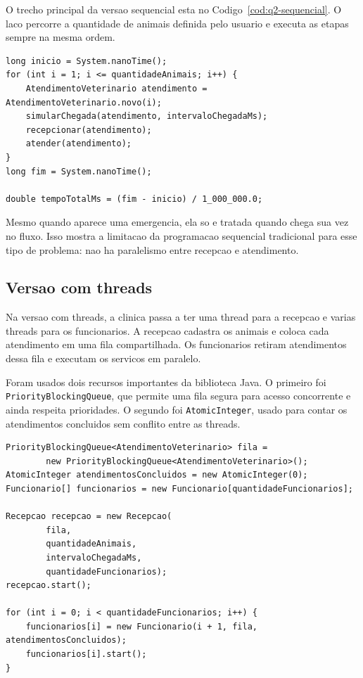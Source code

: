 O trecho principal da versao sequencial esta no Codigo~\ref{cod:q2-sequencial}. O laco percorre a quantidade de animais definida pelo usuario e executa as etapas sempre na mesma ordem.

\begin{lstlisting}[caption={Fluxo principal da versao sequencial.}, label={cod:q2-sequencial}]
long inicio = System.nanoTime();
for (int i = 1; i <= quantidadeAnimais; i++) {
    AtendimentoVeterinario atendimento = AtendimentoVeterinario.novo(i);
    simularChegada(atendimento, intervaloChegadaMs);
    recepcionar(atendimento);
    atender(atendimento);
}
long fim = System.nanoTime();

double tempoTotalMs = (fim - inicio) / 1_000_000.0;
\end{lstlisting}

Mesmo quando aparece uma emergencia, ela so e tratada quando chega sua vez no fluxo. Isso mostra a limitacao da programacao sequencial tradicional para esse tipo de problema: nao ha paralelismo entre recepcao e atendimento.

\subsection{Versao com threads}

Na versao com threads, a clinica passa a ter uma thread para a recepcao e varias threads para os funcionarios. A recepcao cadastra os animais e coloca cada atendimento em uma fila compartilhada. Os funcionarios retiram atendimentos dessa fila e executam os servicos em paralelo.

Foram usados dois recursos importantes da biblioteca Java. O primeiro foi \texttt{PriorityBlockingQueue}, que permite uma fila segura para acesso concorrente e ainda respeita prioridades. O segundo foi \texttt{AtomicInteger}, usado para contar os atendimentos concluidos sem conflito entre as threads.

\begin{lstlisting}[caption={Criacao da fila compartilhada, contador e threads de funcionarios.}, label={cod:q2-threads-main}]
PriorityBlockingQueue<AtendimentoVeterinario> fila =
        new PriorityBlockingQueue<AtendimentoVeterinario>();
AtomicInteger atendimentosConcluidos = new AtomicInteger(0);
Funcionario[] funcionarios = new Funcionario[quantidadeFuncionarios];

Recepcao recepcao = new Recepcao(
        fila,
        quantidadeAnimais,
        intervaloChegadaMs,
        quantidadeFuncionarios);
recepcao.start();

for (int i = 0; i < quantidadeFuncionarios; i++) {
    funcionarios[i] = new Funcionario(i + 1, fila, atendimentosConcluidos);
    funcionarios[i].start();
}
\end{lstlisting}

